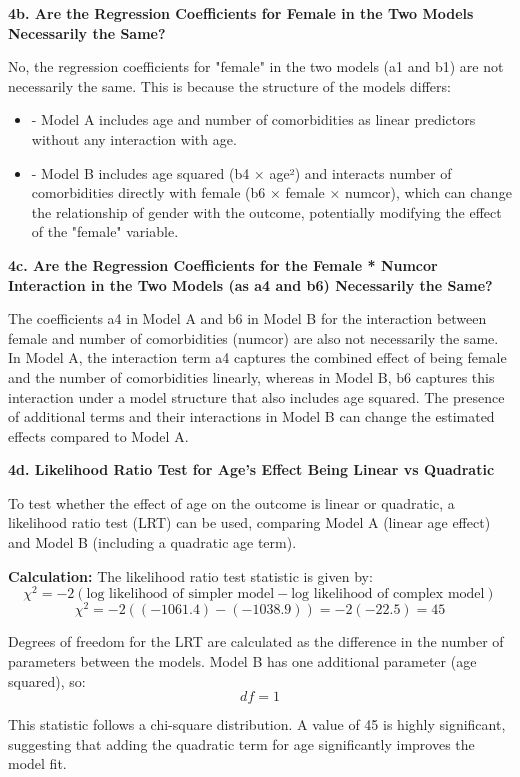 \documentclass{article}
\begin{document}
\textbf{4b. Are the Regression Coefficients for Female in the Two Models Necessarily the Same?}

No, the regression coefficients for "female" in the two models (a1 and b1) are not necessarily the same. This is because the structure of the models differs:
\begin{itemize}
    \item - Model A includes age and number of comorbidities as linear predictors without any interaction with age.
    \item - Model B includes age squared (b4 × age²) and interacts number of comorbidities directly with female (b6 × female × numcor), which can change the relationship of gender with the outcome, potentially modifying the effect of the "female" variable.
\end{itemize}

\textbf{4c. Are the Regression Coefficients for the Female * Numcor Interaction in the Two Models (as a4 and b6) Necessarily the Same?}

The coefficients a4 in Model A and b6 in Model B for the interaction between female and number of comorbidities (numcor) are also not necessarily the same. In Model A, the interaction term a4 captures the combined effect of being female and the number of comorbidities linearly, whereas in Model B, b6 captures this interaction under a model structure that also includes age squared. The presence of additional terms and their interactions in Model B can change the estimated effects compared to Model A.

\textbf{4d. Likelihood Ratio Test for Age's Effect Being Linear vs Quadratic}

To test whether the effect of age on the outcome is linear or quadratic, a likelihood ratio test (LRT) can be used, comparing Model A (linear age effect) and Model B (including a quadratic age term).

\textbf{Calculation:}
The likelihood ratio test statistic is given by:
\[ \chi^2 = -2(\text{log likelihood of simpler model} - \text{log likelihood of complex model}) \]
\[ \chi^2 = -2((-1061.4) - (-1038.9)) = -2(-22.5) = 45 \]

Degrees of freedom for the LRT are calculated as the difference in the number of parameters between the models. Model B has one additional parameter (age squared), so:
\[ df = 1 \]

This statistic follows a chi-square distribution. A value of 45 is highly significant, suggesting that adding the quadratic term for age significantly improves the model fit.
\end{document}

